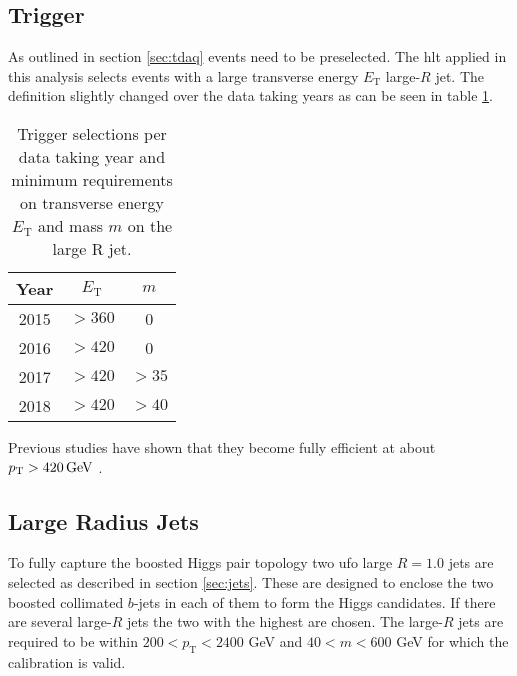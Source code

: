 \subsection{Trigger}
As outlined in section \ref{sec:tdaq} events need to be preselected. The \ac{hlt} applied in this analysis selects events with a large transverse energy $E_\text{T}$ large-$R$ jet. The definition slightly changed over the data taking years as can be seen in table \ref{tab:trigger}.
\begin{table}[htbp]
    \centering
    \caption{Trigger selections per data taking year and minimum requirements on transverse energy $E_\text{T}$ and mass $m$ on the large R jet. }
    \begin{tabular}{ccc}
        \hline
        Year & $E_\text{T}$ & $m$   \\ \hline
        2015 & $>360$       & 0     \\
        2016 & $>420$       & 0     \\
        2017 & $>420$       & $>35$ \\
        2018 & $>420$       & $>40$ \\ \hline
    \end{tabular}
    \label{tab:trigger}
\end{table}
Previous studies have shown that they become fully efficient at about $p_{\text{T}}>\qty[]{420}{GeV}$ \citep{ATL-COM-PHYS-2020-083,ATL-COM-PHYS-2023-033}.

\subsection{Large Radius Jets}
To fully capture the boosted Higgs pair topology two \ac{ufo} large $R=1.0$ jets are selected as described in section \ref{sec:jets}. These are designed to enclose the two boosted collimated $b$-jets in each of them to form the Higgs candidates. If there are several large-$R$ jets the two with the highest \pt are chosen. The large-$R$ jets are required to be within $200<p_{\text{T}}<2400$ GeV and $40<m<600$ GeV for which the calibration is valid.

